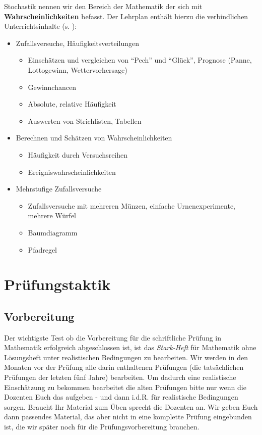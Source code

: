\documentclass[a4paper]{book}%
\theoremstyle{definition}
\begin{document}
Stochastik nennen wir den Bereich der Mathematik der sich mit \textbf{Wahrscheinlichkeiten} befasst. Der Lehrplan \citep{LehrplanMathematikHauptschuleHessen2017} enthält hierzu die verbindlichen Unterrichtsinhalte (s. \citep[S.22]{LehrplanMathematikHauptschuleHessen2017}):
\begin{itemize}
  \item Zufallsversuche, Häufigkeitsverteilungen
    \begin{itemize}
      \item Einschätzen und vergleichen von \enquote{Pech} und \enquote{Glück}, Prognose (Panne, Lottogewinn, Wettervorhersage)
      \item Gewinnchancen
      \item Absolute, relative Häufigkeit
      \item Auswerten von Strichlisten, Tabellen
    \end{itemize}
  \item Berechnen und Schätzen von Wahrscheinlichkeiten
    \begin{itemize}
      \item Häufigkeit durch Versuchsreihen
      \item Ereigniswahrscheinlichkeiten
    \end{itemize}
  \item Mehrstufige Zufallsversuche
    \begin{itemize}
      \item Zufallsversuche mit mehreren Münzen, einfache Urnenexperimente, mehrere Würfel
      \item Baumdiagramm
      \item Pfadregel
    \end{itemize}
\end{itemize}


\chapter{Prüfungstaktik}

\section{Vorbereitung}

Der wichtigste Test ob die Vorbereitung für die schriftliche Prüfung in Mathematik erfolgreich abgeschlossen ist, ist das \textit{Stark-Heft} für Mathematik ohne Lösungsheft unter realistischen Bedingungen zu bearbeiten. Wir werden in den Monaten vor der Prüfung alle darin enthaltenen Prüfungen (die tatsächlichen Prüfungen der letzten fünf Jahre) bearbeiten. Um dadurch eine realistische Einschätzung zu bekommen bearbeitet die alten Prüfungen bitte nur wenn die Dozenten Euch das aufgeben - und dann i.d.R. für realistische Bedingungen sorgen. Braucht Ihr Material zum Üben sprecht die Dozenten an. Wir geben Euch dann passendes Material, das aber nicht in eine komplette Prüfung eingebunden ist, die wir später noch für die Prüfungsvorbereitung brauchen.
\end{document}
